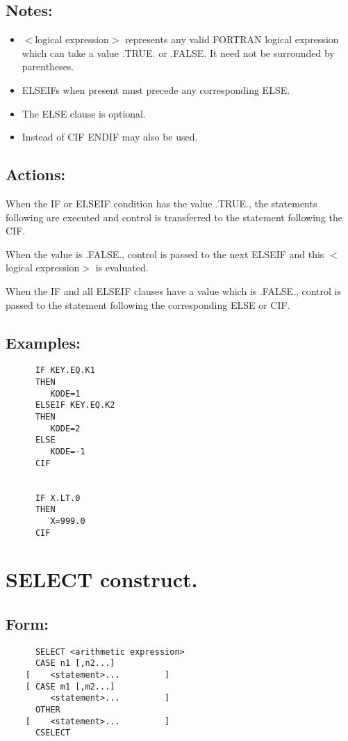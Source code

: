 \subsection{Notes:}
\begin{itemize}

\item $<$logical expression$>$ represents any valid FORTRAN logical
expression which can take a value .TRUE.  or .FALSE.  It need not be
surrounded by parentheses. 

\item ELSEIFs when present must precede any corresponding ELSE. 

\item The ELSE clause is optional. 

\item Instead of CIF ENDIF may also be used. 

\end{itemize}
\subsection{Actions:}

When the IF or ELSEIF condition has the value .TRUE., the statements
following are executed and control is transferred to the statement
following the CIF. 

When the value is .FALSE., control is passed to the next ELSEIF and this
$<$logical expression$>$ is evaluated. 

When the IF and all ELSEIF clauses have a value which is .FALSE.,
control is passed to the statement following the corresponding ELSE or
CIF. 

\subsection{Examples:}
\begin{verbatim}
      IF KEY.EQ.K1 
      THEN 
         KODE=1 
      ELSEIF KEY.EQ.K2 
      THEN 
         KODE=2 
      ELSE 
         KODE=-1
      CIF


      IF X.LT.0 
      THEN
         X=999.0 
      CIF 
\end{verbatim}
\section{SELECT construct.}
\subsection{Form:}
\begin{verbatim}
      SELECT <arithmetic expression>
      CASE n1 [,n2...]
    [    <statement>...         ] 
    [ CASE m1 [,m2...]
         <statement>...         ] 
      OTHER 
    [    <statement>...         ] 
      CSELECT 
\end{verbatim}
